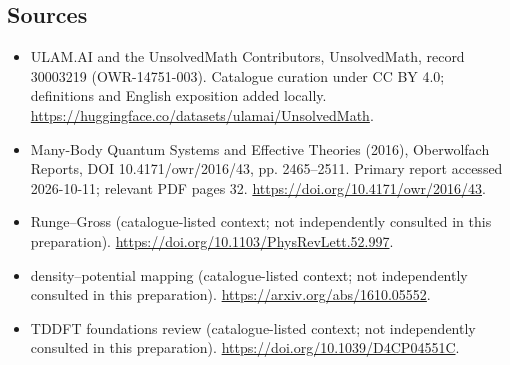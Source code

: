 \documentclass[11pt]{article}
\begin{document}
\subsection{Sources}
\begin{itemize}
\item[\hypertarget{source:30003219:1}{S1}] ULAM.AI and the UnsolvedMath Contributors, UnsolvedMath, record 30003219 (OWR-14751-003). Catalogue curation under CC BY 4.0; definitions and English exposition added locally.
\url{https://huggingface.co/datasets/ulamai/UnsolvedMath}.
\item[\hypertarget{source:30003219:2}{S2}] Many-Body Quantum Systems and Effective Theories (2016), Oberwolfach Reports, DOI 10.4171/owr/2016/43, pp. 2465--2511. Primary report accessed 2026-10-11; relevant PDF pages 32.
\url{https://doi.org/10.4171/owr/2016/43}.
\item[\hypertarget{source:30003219:3}{S3}] Runge--Gross (catalogue-listed context; not independently consulted in this preparation).
\url{https://doi.org/10.1103/PhysRevLett.52.997}.
\item[\hypertarget{source:30003219:4}{S4}] density--potential mapping (catalogue-listed context; not independently consulted in this preparation).
\url{https://arxiv.org/abs/1610.05552}.
\item[\hypertarget{source:30003219:5}{S5}] TDDFT foundations review (catalogue-listed context; not independently consulted in this preparation).
\url{https://doi.org/10.1039/D4CP04551C}.
\end{itemize}
\label{end:30003219}
\end{document}
